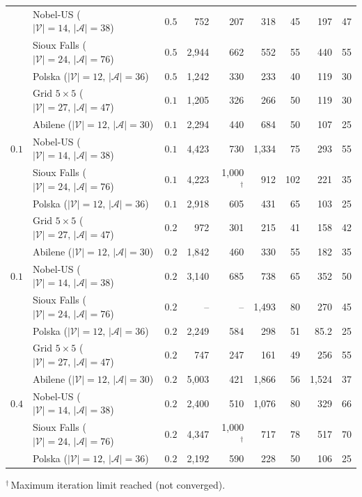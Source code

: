 \begin{table}[t]
\begin{tabular}{cl c rr rr rr}
 & Nobel-US {\scriptsize($|\mathcal{V}|\!=\!14,\, |\mathcal{A}|\!=\!38$)} & $0.5$ & 752 & 207 & 318 & 45 & 197 & 47 \\
 & Sioux Falls {\scriptsize($|\mathcal{V}|\!=\!24,\, |\mathcal{A}|\!=\!76$)} & $0.5$ & 2,944 & 662 & 552 & 55 & 440 & 55 \\
 & Polska {\scriptsize($|\mathcal{V}|\!=\!12,\, |\mathcal{A}|\!=\!36$)} & $0.5$ & 1,242 & 330 & 233 & 40 & 119 & 30 \\
\midrule
\multirow{5}{*}{$0.1$} & Grid $5\times5$ {\scriptsize($|\mathcal{V}|\!=\!27,\, |\mathcal{A}|\!=\!47$)} & $0.1$ & 1,205 & 326 & 266 & 50 & 119 & 30 \\
 & Abilene {\scriptsize($|\mathcal{V}|\!=\!12,\, |\mathcal{A}|\!=\!30$)} & $0.1$ & 2,294 & 440 & 684 & 50 & 107 & 25 \\
 & Nobel-US {\scriptsize($|\mathcal{V}|\!=\!14,\, |\mathcal{A}|\!=\!38$)} & $0.1$ & 4,423 & 730 & 1,334 & 75 & 293 & 55 \\
 & Sioux Falls {\scriptsize($|\mathcal{V}|\!=\!24,\, |\mathcal{A}|\!=\!76$)} & $0.1$ & 4,223 & 1,000$^\dagger$ & 912 & 102 & 221 & 35 \\
 & Polska {\scriptsize($|\mathcal{V}|\!=\!12,\, |\mathcal{A}|\!=\!36$)} & $0.1$ & 2,918 & 605 & 431 & 65 & 103 & 25 \\
\midrule
\multirow{5}{*}{$0.1$} & Grid $5\times5$ {\scriptsize($|\mathcal{V}|\!=\!27,\, |\mathcal{A}|\!=\!47$)} & $0.2$ & 972 & 301 & 215 & 41 & 158 & 42 \\
 & Abilene {\scriptsize($|\mathcal{V}|\!=\!12,\, |\mathcal{A}|\!=\!30$)} & $0.2$ & 1,842 & 460 & 330 & 55 & 182 & 35 \\
 & Nobel-US {\scriptsize($|\mathcal{V}|\!=\!14,\, |\mathcal{A}|\!=\!38$)} & $0.2$ & 3,140 & 685 & 738 & 65 & 352 & 50 \\
 & Sioux Falls {\scriptsize($|\mathcal{V}|\!=\!24,\, |\mathcal{A}|\!=\!76$)} & $0.2$ & -- & -- & 1,493 & 80 & 270 & 45 \\
 & Polska {\scriptsize($|\mathcal{V}|\!=\!12,\, |\mathcal{A}|\!=\!36$)} & $0.2$ & 2,249 & 584 & 298 & 51 & 85.2 & 25 \\
\midrule
\multirow{5}{*}{$0.4$} & Grid $5\times5$ {\scriptsize($|\mathcal{V}|\!=\!27,\, |\mathcal{A}|\!=\!47$)} & $0.2$ & 747 & 247 & 161 & 49 & 256 & 55 \\
 & Abilene {\scriptsize($|\mathcal{V}|\!=\!12,\, |\mathcal{A}|\!=\!30$)} & $0.2$ & 5,003 & 421 & 1,866 & 56 & 1,524 & 37 \\
 & Nobel-US {\scriptsize($|\mathcal{V}|\!=\!14,\, |\mathcal{A}|\!=\!38$)} & $0.2$ & 2,400 & 510 & 1,076 & 80 & 329 & 66 \\
 & Sioux Falls {\scriptsize($|\mathcal{V}|\!=\!24,\, |\mathcal{A}|\!=\!76$)} & $0.2$ & 4,347 & 1,000$^\dagger$ & 717 & 78 & 517 & 70 \\
 & Polska {\scriptsize($|\mathcal{V}|\!=\!12,\, |\mathcal{A}|\!=\!36$)} & $0.2$ & 2,192 & 590 & 228 & 50 & 106 & 25 \\
\bottomrule
\end{tabular}
\vspace{2pt}
{\footnotesize $^\dagger$\,Maximum iteration limit reached (not converged).}
\end{table}